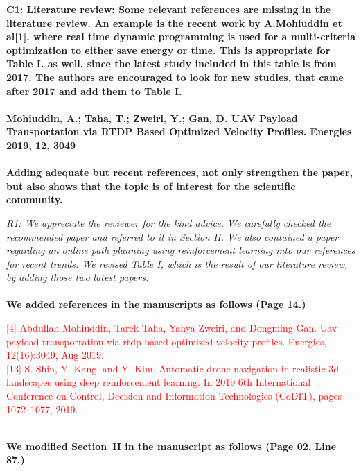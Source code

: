 \documentclass[onecolumn]{IEEEconf}
\begin{document}
\begin{description}
    \item \textbf
	{
	C1: Literature review:
    Some relevant references are missing in the literature review. An example is the recent work by A.Mohiuddin et al[1]. where real time dynamic programming is used for a multi-criteria optimization to either save energy or time. This is appropriate for Table I. as well, since the latest study included in this table is from 2017. The authors are encouraged to look for new studies, that came after 2017 and add them to Table I.~\\~\\
    Mohiuddin, A.; Taha, T.; Zweiri, Y.; Gan, D. UAV Payload Transportation via RTDP Based Optimized Velocity Profiles. Energies 2019, 12, 3049~\\~\\
    Adding adequate but recent references, not only strengthen the paper, but also shows that the topic is of interest for the scientific community.
	}
	\item \textit
	{ 
	R1: We appreciate the reviewer for the kind advice. We carefully checked the recommended paper and referred to it in Section II. We also contained a paper regarding an online path planning using reinforcement learning into our references for recent trends. We revised Table I, which is the result of our literature review, by adding those two latest papers.  
	}
    ~\\
    ~\\
	\textbf{We added references in the manuscripts as follows (Page 14.)}\\
    \begin{mdframed}[ linewidth=.75pt, userdefinedwidth=0.9\textwidth]
    \textcolor{red}{[4] Abdullah Mohiuddin, Tarek Taha, Yahya Zweiri, and Dongming Gan. Uav payload transportation via rtdp  based optimized velocity profiles. Energies, 12(16):3049, Aug 2019.} \\
    \textcolor{red}{[13] S. Shin, Y. Kang, and Y. Kim. Automatic drone navigation in realistic 3d landscapes using deep reinforcement learning. 
    In 2019 6th International Conference on Control, Decision and Information Technologies (CoDIT), pages 1072–1077, 2019.}
    \end{mdframed} 
	~\\
    \textbf{We modified Section~II in the manuscript as follows (Page 02, Line 87.)}\\
    \begin{mdframed}[ linewidth=.75pt, userdefinedwidth=0.9\textwidth]

\end{mdframed}
\end{description}
\end{document}
